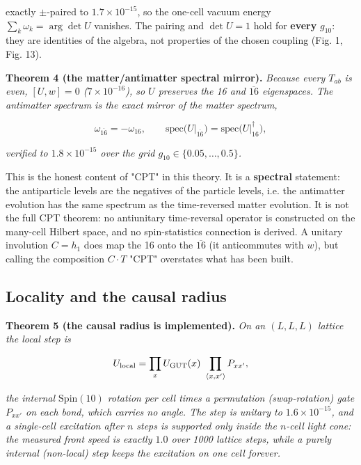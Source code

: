 \documentclass[aps,prd,amsmath,amssymb,superscriptaddress,longbibliography,floatfix,preprint]{revtex4-2}
\begin{document}
exactly $\pm$-paired to $1.7\times10^{-15}$, so the one-cell vacuum energy $\sum_k \omega_k = \arg\det U$ vanishes. The pairing and $\det U = 1$ hold for \textbf{every} $g_{10}$: they are identities of the algebra, not properties of the chosen coupling (Fig. 1, Fig. 13).

\textbf{Theorem 4 (the matter/antimatter spectral mirror).} \emph{Because every $T_{ab}$ is even, $[U,\allowbreak{}w] = 0$ ($7\times10^{-16}$), so $U$ preserves the 16 and $\overline{16}$ eigenspaces. The antimatter spectrum is the exact mirror of the matter spectrum,}

\[\omega_{\overline{16}} = -\omega_{16},\qquad \mathrm{spec}\big(U\big|_{\overline{16}}\big) = \mathrm{spec}\big(U\big|_{16}^\dagger\big),\]

\emph{verified to $1.8\times10^{-15}$ over the grid $g_{10} \in \{0.05,\allowbreak{}\dots,\allowbreak{}0.5\}$.}

This is the honest content of "CPT" in this theory. It is a \textbf{spectral} statement: the antiparticle levels are the negatives of the particle levels, i.e. the antimatter evolution has the same spectrum as the time-reversed matter evolution. It is not the full CPT theorem: no antiunitary time-reversal operator is constructed on the many-cell Hilbert space, and no spin-statistics connection is derived. A unitary involution $C = h_1$ does map the 16 onto the $\overline{16}$ (it anticommutes with $w$), but calling the composition $C\cdot T$ "CPT" overstates what has been built.

\subsection{Locality and the causal radius}

\textbf{Theorem 5 (the causal radius is implemented).} \emph{On an $(L,\allowbreak{}L,\allowbreak{}L)$ lattice the local step is}

\[U_{\rm local} = \prod_x U_{\rm GUT}(x)\ \prod_{\langle x,x'\rangle} P_{xx'},\]

\emph{the internal $\mathrm{Spin}(10)$ rotation per cell times a permutation (swap-rotation) gate $P_{xx'}$ on each bond, which carries no angle. The step is unitary to $1.6\times10^{-15}$, and a single-cell excitation after $n$ steps is supported only inside the $n$-cell light cone: the measured front speed is exactly $1.0$ over 1000 lattice steps, while a purely internal (non-local) step keeps the excitation on one cell forever.}
\end{document}
